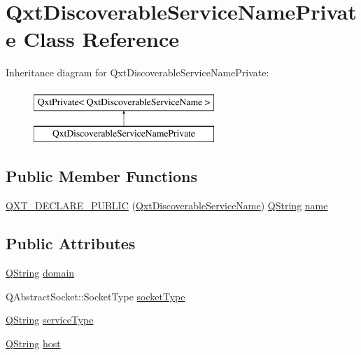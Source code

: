 \hypertarget{class_qxt_discoverable_service_name_private}{\section{Qxt\-Discoverable\-Service\-Name\-Private Class Reference}
\label{class_qxt_discoverable_service_name_private}
}
Inheritance diagram for Qxt\-Discoverable\-Service\-Name\-Private\-:\begin{figure}[H]
\begin{center}
\leavevmode
\includegraphics[height=2.000000cm]{class_qxt_discoverable_service_name_private}
\end{center}
\end{figure}
\subsection*{Public Member Functions}
\begin{DoxyCompactItemize}
\item 
\hyperlink{class_qxt_discoverable_service_name_private_a2e594065e8bb160deec79cacaa706acc}{Q\-X\-T\-\_\-\-D\-E\-C\-L\-A\-R\-E\-\_\-\-P\-U\-B\-L\-I\-C} (\hyperlink{class_qxt_discoverable_service_name}{Qxt\-Discoverable\-Service\-Name}) \hyperlink{group___u_a_v_objects_plugin_gab9d252f49c333c94a72f97ce3105a32d}{Q\-String} \hyperlink{glext_8h_ad977737dfc9a274a62741b9500c49a32}{name}
\end{DoxyCompactItemize}
\subsection*{Public Attributes}
\begin{DoxyCompactItemize}
\item 
\hyperlink{group___u_a_v_objects_plugin_gab9d252f49c333c94a72f97ce3105a32d}{Q\-String} \hyperlink{class_qxt_discoverable_service_name_private_a9ce2b92b2a9a93aca9c97e53fe9a06e1}{domain}
\item 
Q\-Abstract\-Socket\-::\-Socket\-Type \hyperlink{class_qxt_discoverable_service_name_private_a73cdf821839df7e6521254dc689a4a05}{socket\-Type}
\item 
\hyperlink{group___u_a_v_objects_plugin_gab9d252f49c333c94a72f97ce3105a32d}{Q\-String} \hyperlink{class_qxt_discoverable_service_name_private_a0c73907f9b0e2f19080ddc550235417b}{service\-Type}
\item 
\hyperlink{group___u_a_v_objects_plugin_gab9d252f49c333c94a72f97ce3105a32d}{Q\-String} \hyperlink{class_qxt_discoverable_service_name_private_ac7e1d4eda4c53004cf6f13c2b8181456}{host}
\end{DoxyCompactItemize}
